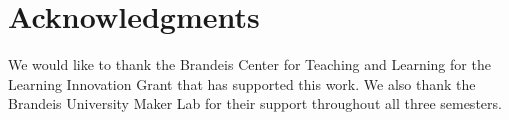 \section{Acknowledgments} We would like to thank the Brandeis Center for Teaching and Learning for the Learning Innovation Grant that has supported this work. We also thank the Brandeis University Maker Lab for their support throughout all three semesters. 